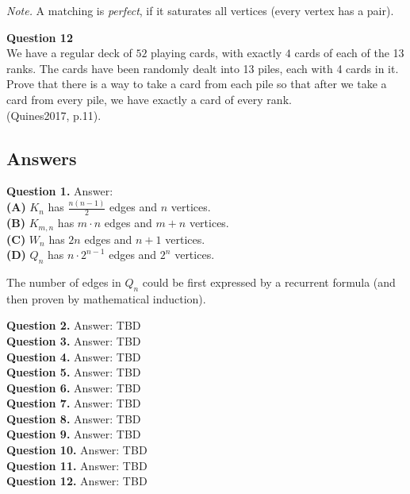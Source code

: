 \documentclass[jou]{apa6}
\begin{document}
{\em Note.} A matching is {\em perfect}, if it saturates all vertices
(every vertex has a pair).

\vspace{10pt}
{\bf Question 12}\\
We have a regular deck of $52$ playing cards, with exactly $4$ cards of each of the
13 ranks. The cards have been randomly dealt into 13 piles, each with 4 cards in
it. Prove that there is a way to take a card from each pile so that after we take
a card from every pile, we have exactly a card of every rank.\\
(Quines2017, p.11).


\newpage
\subsection{Answers}

\vspace{10pt}
{\bf Question 1.} Answer:\\

{\bf (A)} $K_n$ has $\frac{n(n-1)}{2}$ edges and $n$ vertices.\\
{\bf (B)} $K_{m,n}$ has $m \cdot n$ edges and $m+n$ vertices.\\
{\bf (C)} $W_n$ has $2n$ edges and $n+1$ vertices.\\
{\bf (D)} $Q_n$ has $n \cdot 2^{n-1}$ edges and $2^n$ vertices.

The number of edges in $Q_n$ could be first expressed by a recurrent formula
(and then proven by mathematical induction).

\vspace{10pt}
{\bf Question 2.} Answer: TBD\\

\vspace{10pt}
{\bf Question 3.} Answer: TBD\\

\vspace{10pt}
{\bf Question 4.} Answer: TBD\\

\vspace{10pt}
{\bf Question 5.} Answer: TBD\\

\vspace{10pt}
{\bf Question 6.} Answer: TBD\\

\vspace{10pt}
{\bf Question 7.} Answer: TBD\\

\vspace{10pt}
{\bf Question 8.} Answer: TBD\\

\vspace{10pt}
{\bf Question 9.} Answer: TBD\\

\vspace{10pt}
{\bf Question 10.} Answer: TBD\\

\vspace{10pt}
{\bf Question 11.} Answer: TBD\\

\vspace{10pt}
{\bf Question 12.} Answer: TBD\\
\end{document}
